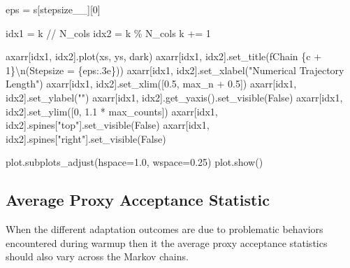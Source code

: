 \documentclass[
  letterpaper,
  DIV=11,
  numbers=noendperiod]{scrartcl}
\newenvironment{Shaded}{\begin{snugshade}}{\end{snugshade}}
\newcommand{\CharTok}[1]{\textcolor[rgb]{0.13,0.47,0.30}{#1}}
\newcommand{\DecValTok}[1]{\textcolor[rgb]{0.68,0.00,0.00}{#1}}
\newcommand{\FloatTok}[1]{\textcolor[rgb]{0.68,0.00,0.00}{#1}}
\newcommand{\NormalTok}[1]{\textcolor[rgb]{0.00,0.23,0.31}{#1}}
\newcommand{\OperatorTok}[1]{\textcolor[rgb]{0.37,0.37,0.37}{#1}}
\newcommand{\SpecialCharTok}[1]{\textcolor[rgb]{0.37,0.37,0.37}{#1}}
\newcommand{\SpecialStringTok}[1]{\textcolor[rgb]{0.13,0.47,0.30}{#1}}
\newcommand{\StringTok}[1]{\textcolor[rgb]{0.13,0.47,0.30}{#1}}
\newcommand{\VariableTok}[1]{\textcolor[rgb]{0.07,0.07,0.07}{#1}}
\begin{document}
\begin{Shaded}
\begin{Highlighting}[]
\NormalTok{    eps }\OperatorTok{=}\NormalTok{ s[}\StringTok{\textquotesingle{}stepsize\_\_\textquotesingle{}}\NormalTok{][}\DecValTok{0}\NormalTok{]}

\NormalTok{    idx1 }\OperatorTok{=}\NormalTok{ k }\OperatorTok{//}\NormalTok{ N\_cols}
\NormalTok{    idx2 }\OperatorTok{=}\NormalTok{ k }\OperatorTok{\%}\NormalTok{ N\_cols}
\NormalTok{    k }\OperatorTok{+=} \DecValTok{1}

\NormalTok{    axarr[idx1, idx2].plot(xs, ys, dark)}
\NormalTok{    axarr[idx1, idx2].set\_title(}\SpecialStringTok{f\textquotesingle{}Chain }\SpecialCharTok{\{}\NormalTok{c }\OperatorTok{+} \DecValTok{1}\SpecialCharTok{\}}\CharTok{\textbackslash{}n}\SpecialStringTok{(Stepsize = }\SpecialCharTok{\{}\NormalTok{eps}\SpecialCharTok{:.3e\}}\SpecialStringTok{)\textquotesingle{}}\NormalTok{)}
\NormalTok{    axarr[idx1, idx2].set\_xlabel(}\StringTok{"Numerical Trajectory Length"}\NormalTok{)}
\NormalTok{    axarr[idx1, idx2].set\_xlim([}\FloatTok{0.5}\NormalTok{, max\_n }\OperatorTok{+} \FloatTok{0.5}\NormalTok{])}
\NormalTok{    axarr[idx1, idx2].set\_ylabel(}\StringTok{""}\NormalTok{)}
\NormalTok{    axarr[idx1, idx2].get\_yaxis().set\_visible(}\VariableTok{False}\NormalTok{)}
\NormalTok{    axarr[idx1, idx2].set\_ylim([}\DecValTok{0}\NormalTok{, }\FloatTok{1.1} \OperatorTok{*}\NormalTok{ max\_counts])}
\NormalTok{    axarr[idx1, idx2].spines[}\StringTok{"top"}\NormalTok{].set\_visible(}\VariableTok{False}\NormalTok{)}
\NormalTok{    axarr[idx1, idx2].spines[}\StringTok{"right"}\NormalTok{].set\_visible(}\VariableTok{False}\NormalTok{)}
  
\NormalTok{  plot.subplots\_adjust(hspace}\OperatorTok{=}\FloatTok{1.0}\NormalTok{, wspace}\OperatorTok{=}\FloatTok{0.25}\NormalTok{)}
\NormalTok{  plot.show()}
\end{Highlighting}
\end{Shaded}

\hypertarget{average-proxy-acceptance-statistic}{%
\subsection{Average Proxy Acceptance
Statistic}\label{average-proxy-acceptance-statistic}}

When the different adaptation outcomes are due to problematic behaviors
encountered during warmup then it the average proxy acceptance
statistics should also vary across the Markov chains.
\end{document}
